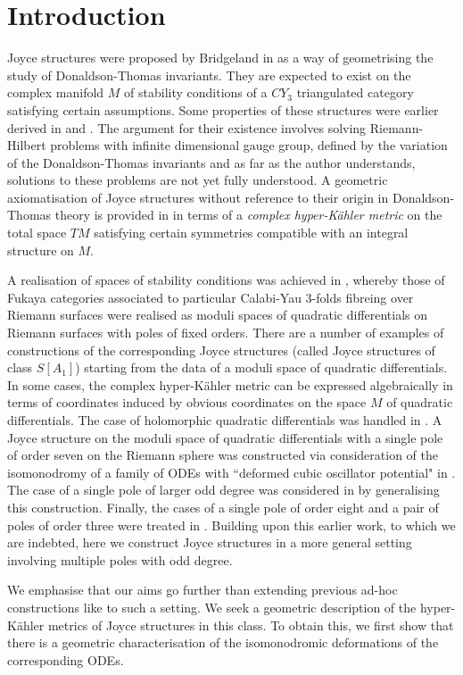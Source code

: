 \documentclass[a4paper,12pt,reqno]{amsart}
\numberwithin{equation}{section}
\numberwithin{counter2}{section}
\begin{document}
\section{Introduction}
Joyce structures were proposed by Bridgeland in \cite{B3} as a way of geometrising the study of Donaldson-Thomas invariants.  They are expected to exist on the complex manifold $M$ of stability conditions of a $CY_3$ triangulated category satisfying certain assumptions.  Some properties of these structures were earlier derived in \cite{J} and \cite{JS}.  
 The argument for their existence involves solving Riemann-Hilbert problems with infinite dimensional gauge group,  defined by the variation of the Donaldson-Thomas invariants and as far as the author understands,  solutions to these problems are not yet fully understood.   A geometric axiomatisation of Joyce structures without reference to their origin in Donaldson-Thomas theory is provided in \cite{BS} in terms of a \textit{complex hyper-K\"ahler metric} on the total space $TM$ satisfying certain symmetries compatible with an integral structure on $M$.  \par 
A realisation of spaces of stability conditions was achieved in \cite{BS2},  whereby those of Fukaya categories associated to particular Calabi-Yau $3$-folds fibreing over Riemann surfaces were realised as moduli spaces of quadratic differentials on Riemann surfaces with poles of fixed orders.  There are a number of examples of constructions of the corresponding Joyce structures (called Joyce structures of class $S[A_1]$) starting from the data of a moduli space of quadratic differentials.  In some cases,  the complex hyper-K\"ahler metric can be expressed algebraically in terms of coordinates induced by obvious coordinates on the space $M$ of quadratic differentials.  The case of holomorphic quadratic differentials was handled in \cite{B2}.  A Joyce structure on the moduli space of quadratic differentials with a single pole of order seven on the Riemann sphere was constructed via consideration of the isomonodromy of a family of ODEs with ``deformed cubic oscillator potential" in \cite{BM}.  The case of a single pole of larger odd degree was considered in \cite{DM24} by generalising this construction.  Finally,  the cases of a single pole of order eight and a pair of poles of order three were treated in \cite{BdM}.  
Building upon this earlier work,  to which we are indebted,  here we construct Joyce structures in a more general setting involving multiple poles with odd degree.   \par We emphasise that our aims go further than  extending previous ad-hoc constructions like \cite{DM24} to such a setting.  We seek a geometric description of the hyper-K\"ahler metrics of Joyce structures in this class.  To obtain this,  we first show that there is a geometric characterisation of the isomonodromic deformations of the corresponding ODEs.    
\end{document}
